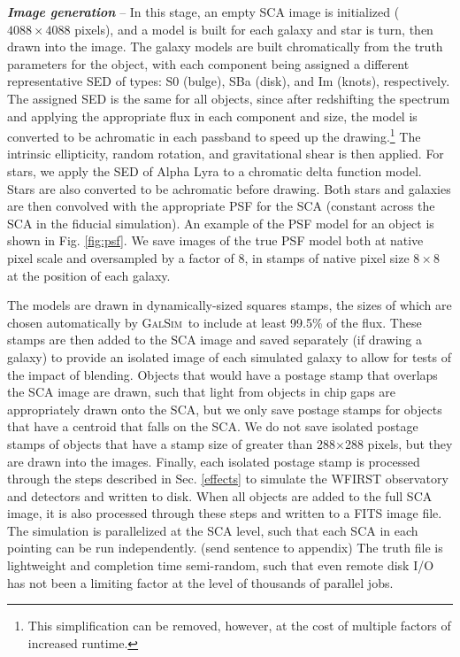 \documentclass[aps,prd, amsmath,amssymb,superscriptaddress,showkeys,nofootinbib,reprint,preprintnumbers]{revtex4-1}
\newcommand{\galsim}{\textsc{GalSim}}
\begin{document}
\textbf{\textit{Image generation}} -- In this stage, an empty SCA image is initialized ($4088\times4088$ pixels), and a model is built for each galaxy and star is turn, then drawn into the image. 
The galaxy models are built chromatically from the truth parameters for the object, with each component being assigned a different representative SED of types: S0 (bulge), SBa (disk), and Im (knots), respectively. 
The assigned SED is the same for all objects, since after redshifting the spectrum and applying the appropriate flux in each component and size, the model is converted to be achromatic in each passband to speed up the drawing.\footnote{This simplification can be removed, however, at the cost of multiple factors of increased runtime.}
The intrinsic ellipticity, random rotation, and gravitational shear is then applied.
For stars, we apply the SED of Alpha Lyra to a chromatic delta function model. 
Stars are also converted to be achromatic before drawing.
Both stars and galaxies are then convolved with the appropriate PSF for the SCA (constant across the SCA in the fiducial simulation). An example of the PSF model for an object is shown in Fig. \ref{fig:psf}. We save images of the true PSF model both at native pixel scale and oversampled by a factor of 8, in stamps of native pixel size $8\times 8$ at the position of each galaxy.

The models are drawn in dynamically-sized squares stamps, the sizes of which are chosen automatically by \galsim\ to include at least 99.5\% of the flux.
These stamps are then added to the SCA image and saved separately (if drawing a galaxy) to provide an isolated image of each simulated galaxy to allow for tests of the impact of blending.
Objects that would have a postage stamp that overlaps the SCA image are drawn, such that light from objects in chip gaps are appropriately drawn onto the SCA, but we only save postage stamps for objects that have a centroid that falls on the SCA. 
We do not save isolated postage stamps of objects that have a stamp size of greater than 288$\times$288 pixels, but they are drawn into the images.
Finally, each isolated postage stamp is processed through the steps described in Sec. \ref{effects} to simulate the WFIRST observatory and detectors and written to disk. When all objects are added to the full SCA image, it is also processed through these steps and written to a FITS image file.
The simulation is parallelized at the SCA level, such that each SCA in each pointing can be run independently. 
(send sentence to appendix) The truth file is lightweight and completion time semi-random, such that even remote disk I/O has not been a limiting factor at the level of thousands of parallel jobs. 
\end{document}
